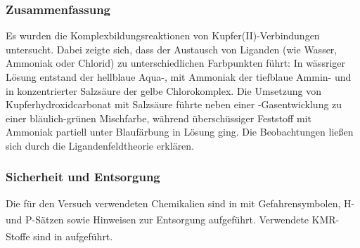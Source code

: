 \documentclass[
	a4paper,										%
	12pt,											%
	twoside,										%
	headsepline,								%
	footsepline,									%
	captions=tableheading,					%
]{scrartcl}
\newcommand{\zitat}[1]{\textsuperscript{\cite{#1}}}
\begin{document}
\subsubsection{Zusammenfassung}

	Es wurden die Komplexbildungsreaktionen von Kupfer(II)-Verbindungen untersucht.
	Dabei zeigte sich, dass der Austausch von Liganden (wie Wasser, Ammoniak oder Chlorid) zu unterschiedlichen Farbpunkten führt:
	In wässriger Lösung entstand der hellblaue Aqua-, mit Ammoniak der tiefblaue Ammin- und in konzentrierter Salzsäure der gelbe Chlorokomplex.
	Die Umsetzung von Kupferhydroxidcarbonat mit Salzsäure führte neben einer -Gasentwicklung zu einer bläulich-grünen Mischfarbe,
	während überschüssiger Feststoff mit Ammoniak partiell unter Blaufärbung in Lösung ging.
	Die Beobachtungen ließen sich durch die Ligandenfeldtheorie erklären.

\subsubsection{Sicherheit und Entsorgung}
		
Die für den Versuch verwendeten Chemikalien sind in  mit Gefahrensymbolen, H- und P-Sätzen sowie Hinweisen zur Entsorgung aufgeführt.\zitat{hauke3} Verwendete KMR-Stoffe sind in  aufgeführt.\zitat{hauke3}
	
\end{document}
